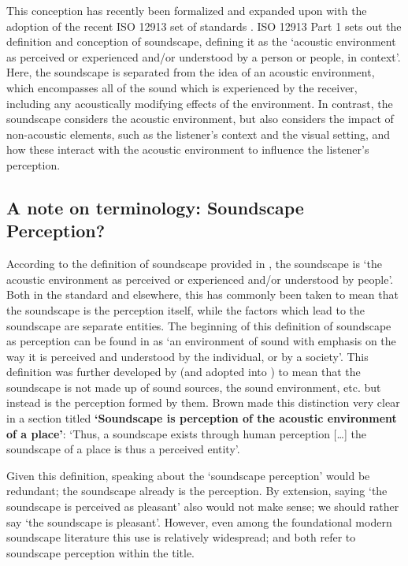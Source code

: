 This conception has recently been formalized and expanded upon with the adoption of the recent ISO 12913 set of standards \citep{ISO12913Part1, ISO12913Part2,ISO12913Part3}. ISO 12913 Part 1 sets out the definition and conception of soundscape, defining it as the `acoustic environment as perceived or experienced and/or understood by a person or people, in context'. Here, the soundscape is separated from the idea of an acoustic environment, which encompasses all of the sound which is experienced by the receiver, including any acoustically modifying effects of the environment. In contrast, the soundscape considers the acoustic environment, but also considers the impact of non-acoustic elements, such as the listener's context and the visual setting, and how these interact with the acoustic environment to influence the listener's perception.


\subsection{A note on terminology: Soundscape Perception?}
\label{sec:terminology}

According to the definition of soundscape provided in \citet{ISO12913Part1}, the soundscape is `the acoustic environment as perceived or experienced and/or understood by people'. Both in the standard and elsewhere, this has commonly been taken to mean that the soundscape is the perception itself, while the factors which lead to the soundscape are separate entities. The beginning of this definition of soundscape as perception can be found in \citet{Truax1999Handbook} as `an environment of sound with emphasis on the way it is perceived and understood by the individual, or by a society'. This definition was further developed by \citet{Brown2012review} (and adopted into \citet{ISO12913Part1}) to mean that the soundscape is not made up of sound sources, the sound environment, etc. but instead is the perception formed by them. Brown made this distinction very clear in a section titled \textbf{`Soundscape is perception of the acoustic environment of a place'}: `Thus, a soundscape exists through human perception [\ldots] the soundscape of a place is thus a perceived entity'.

Given this definition, speaking about the `soundscape perception' would be redundant; the soundscape already is the perception. By extension, saying `the soundscape is perceived as pleasant' also would not make sense; we should rather say `the soundscape is pleasant'. However, even among the foundational modern soundscape literature this use is relatively widespread; \citet{Axelsson2010principal} and \citet{Liu2014Effects} both refer to soundscape perception within the title. 

